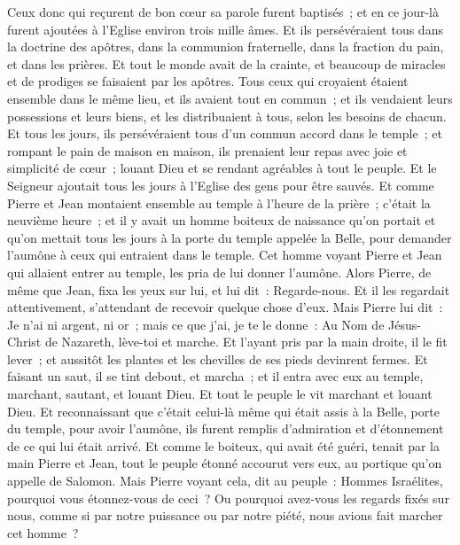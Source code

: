 \begin{multicols}{2}
Ceux donc qui reçurent de bon cœur sa parole furent baptisés~; et en ce jour-là furent ajoutées à l'Eglise environ trois mille âmes.
Et ils persévéraient tous dans la doctrine des apôtres, dans la communion fraternelle, dans la fraction du pain, et dans les prières.
Et tout le monde avait de la crainte, et beaucoup de miracles et de prodiges se faisaient par les apôtres.
Tous ceux qui croyaient étaient ensemble dans le même lieu, et ils avaient tout en commun~;
et ils vendaient leurs possessions et leurs biens, et les distribuaient à tous, selon les besoins de chacun.
Et tous les jours, ils persévéraient tous d'un commun accord dans le temple~; et rompant le pain de maison en maison, ils prenaient leur repas avec joie et simplicité de cœur~;
louant Dieu et se rendant agréables à tout le peuple. Et le Seigneur ajoutait tous les jours à l'Eglise des gens pour être sauvés.
\VerseOne{}Et comme Pierre et Jean montaient ensemble au temple à l'heure de la prière~; c'était la neuvième heure~;
et il y avait un homme boiteux de naissance qu'on portait et qu'on mettait tous les jours à la porte du temple appelée la Belle, pour demander l'aumône à ceux qui entraient dans le temple. 
Cet homme voyant Pierre et Jean qui allaient entrer au temple, les pria de lui donner l'aumône.
Alors Pierre, de même que Jean, fixa les yeux sur lui, et lui dit~: Regarde-nous.
Et il les regardait attentivement, s'attendant de recevoir quelque chose d'eux.
Mais Pierre lui dit~: Je n'ai ni argent, ni or~; mais ce que j'ai, je te le donne~: Au Nom de Jésus-Christ de Nazareth, lève-toi et marche.
Et l'ayant pris par la main droite, il le fit lever~; et aussitôt les plantes et les chevilles de ses pieds devinrent fermes.
Et faisant un saut, il se tint debout, et marcha~; et il entra avec eux au temple, marchant, sautant, et louant Dieu.
Et tout le peuple le vit marchant et louant Dieu.
Et reconnaissant que c'était celui-là même qui était assis à la Belle, porte du temple, pour avoir l'aumône, ils furent remplis d'admiration et d'étonnement de ce qui lui était arrivé.
Et comme le boiteux, qui avait été guéri, tenait par la main Pierre et Jean, tout le peuple étonné accourut vers eux, au portique qu'on appelle de Salomon.
Mais Pierre voyant cela, dit au peuple~: Hommes Israélites, pourquoi vous étonnez-vous de ceci~? Ou pourquoi avez-vous les regards fixés sur nous, comme si par notre puissance ou par notre piété, nous avions fait marcher cet homme~?

\end{multicols}
